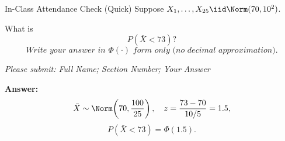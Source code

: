 \documentclass[aspectratio=169]{beamer}
\begin{document}
\begin{frame}{In-Class Attendance Check (Quick)}
  Suppose \(X_1,\dots,X_{25}\iid\Norm(70,10^2)\).

  What is
  \[
    P(\bar X<73)?
  \]
  \[
    \textit{Write your answer in } \Phi(\cdot)\textit{ form only (no decimal approximation).}
  \]

  \vspace{3mm}
  \textit{Please submit: Full Name; Section Number; Your Answer}

  \pause
  \vspace{2mm}
  \textbf{Answer:}
  \[
    \bar X\sim\Norm\!\left(70,\frac{100}{25}\right),\quad
    z=\frac{73-70}{10/5}=1.5,
  \]
  \[
    P(\bar X<73)=\Phi(1.5).
  \]
\end{frame}
\end{document}
